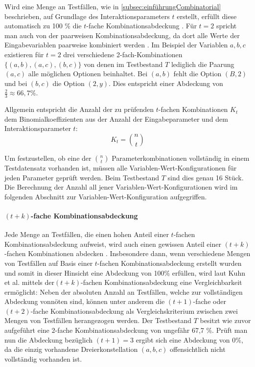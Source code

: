 Wird eine Menge an Testfällen, wie in \autoref{subsec:einführungCombinatorial} beschrieben, auf Grundlage des Interaktionsparameters $t$ erstellt, erfüllt diese automatisch zu 100 \% die $t$-fache Kombinationsabdeckung \cite{kuhn2010practical}. Für $t = 2$ spricht man auch von der paarweisen Kombinationsabdeckung, da dort alle Werte der Eingabevariablen paarweise kombiniert werden \cite{kuhn2010practical}. Im Beispiel der Variablen $a,b,c$ existieren für $t = 2$ drei verschiedene 2-fach-Kombinationen $\{(a,b), (a,c), (b,c)\}$ von denen im Testbestand $T$ lediglich die Paarung $(a,c)$ alle möglichen Optionen beinhaltet. Bei $(a,b)$ fehlt die Option $(B,2)$ und bei $(b,c)$ die Option $(2,y)$. Dies entspricht einer Abdeckung von $\frac{2}{3} \approx 66,7 \%$. 

Allgemein entspricht die Anzahl der zu prüfenden $t$-fachen Kombinationen $K_t$ dem Binomialkoeffizienten aus der Anzahl der Eingabeparameter und dem Interaktionsparameter $t$:
\[
K_t = \binom{n}{t}
\]

Um festzustellen, ob eine der $\binom{n}{t}$ Parameterkombinationen vollständig in einem Testdatensatz vorhanden ist, müssen alle Variablen-Wert-Konfigurationen für jeden Parameter geprüft werden. Beim Testbestand $T$ sind dies genau 16 Stück. Die Berechnung der Anzahl all jener Variablen-Wert-Konfigurationen wird im folgenden Abschnitt zur Variablen-Wert-Konfiguration aufgegriffen.

\paragraph{$(t+k)$-fache Kombinationsabdeckung}

Jede Menge an Testfällen, die einen hohen Anteil einer $t$-fachen Kombinationsabdeckung aufweist, wird auch einen gewissen Anteil einer $(t+k)$-fachen Kombinationen abdecken \cite{kuhn2010practical}. Insbesondere dann, wenn verschiedene Mengen von Testfällen auf Basis einer $t$-fachen Kombinationsabdeckung erstellt wurden und somit in dieser Hinsicht eine Abdeckung von 100\% erfüllen, wird laut Kuhn et al. \cite{kuhn2010practical} mittels der$(t+k)$-fachen Kombinationsabdeckung eine Vergleichbarkeit ermöglicht: Neben der absoluten Anzahl an Testfällen, welche zur vollständigen Abdeckung vonnöten sind, können unter anderem die $(t+1)$-fache oder $(t+2)$-fache Kombinationsabdeckung als Vergleichskriterium zwischen zwei Mengen von Testfällen herangezogen werden. Der Testbestand $T$ besitzt wie zuvor aufgeführt eine $2$-fache Kombinationsabdeckung von ungefähr 67,7 \%. Prüft man nun die Abdeckung bezüglich $(t+1) = 3$ ergibt sich eine Abdeckung von 0\%, da die einzig vorhandene Dreierkonstellation $(a,b,c)$ offensichtlich nicht vollständig vorhanden ist.  


